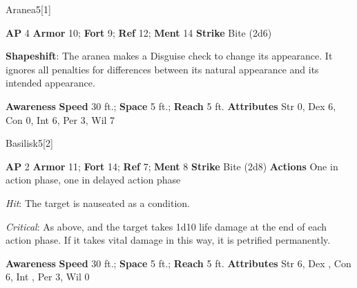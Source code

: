 \begin{monsection}{Aranea}{5}[1]
\vspace{-1em}\vspace{-1em}
\begin{spellcontent}
\begin{spelltargetinginfo}
{\textbf{AP} 4}
\pari \textbf{Armor} 10;
\textbf{Fort} 9;
\textbf{Ref} 12;
\textbf{Ment} 14
\pari \textbf{Strike} Bite  (2d6)
\end{spelltargetinginfo}
\begin{spelleffects}
\pari
\textbf{Shapeshift}:
The aranea makes a Disguise check to change its appearance.
It ignores all penalties for differences between its natural appearance and its intended appearance.
\end{spelleffects}
\end{spellcontent}
\begin{spellsubcontent}
\begin{spellfooter}
\pari \textbf{Awareness} 
\pari \textbf{Speed} 30 ft.;
\textbf{Space} 5 ft.;
\textbf{Reach} 5 ft.
\pari \textbf{Attributes}
Str 0,
Dex 6,
Con 0,
Int 6,
Per 3,
Wil 7
\end{spellfooter}
\end{spellsubcontent}
\end{monsection}
\begin{monsection}{Basilisk}{5}[2]
\vspace{-1em}\vspace{-1em}
\begin{spellcontent}
\begin{spelltargetinginfo}
{\textbf{AP} 2}
\pari \textbf{Armor} 11;
\textbf{Fort} 14;
\textbf{Ref} 7;
\textbf{Ment} 8
\pari \textbf{Strike} Bite  (2d8)
\pari \textbf{Actions} One in action phase, one in delayed action phase
\end{spelltargetinginfo}
\begin{spelleffects}
\pari
{}
\par
\par \textit{Hit}: The target is nauseated as a condition.
\par \textit{Critical}:
As above, and the target takes 1d10 life damage at the end of each action phase.
If it takes vital damage in this way, it is petrified permanently.
\end{spelleffects}
\end{spellcontent}
\begin{spellsubcontent}
\begin{spellfooter}
\pari \textbf{Awareness} 
\pari \textbf{Speed} 30 ft.;
\textbf{Space} 5 ft.;
\textbf{Reach} 5 ft.
\pari \textbf{Attributes}
Str 6,
Dex ,
Con 6,
Int ,
Per 3,
Wil 0
\end{spellfooter}
\end{spellsubcontent}
\end{monsection}
